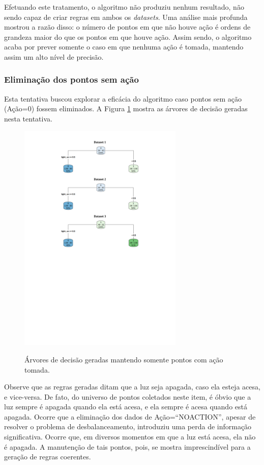 Efetuando este tratamento, o algoritmo não produziu nenhum resultado, não sendo capaz de criar regras em ambos os \textit{datasets}. Uma análise mais profunda mostrou a razão disso: o número de pontos em que não houve ação é ordens de grandeza maior do que os pontos em que houve ação. Assim sendo, o algoritmo acaba por prever somente o caso em que nenhuma ação é tomada, mantendo assim um alto nível de precisão. 

\subsubsection{Eliminação dos pontos sem ação} \label{subsubsec:elim_pts_sem_acao}
Esta tentativa buscou explorar a eficácia do algoritmo caso pontos sem ação (Ação=0) fossem eliminados. A Figura \ref{fig:teste_3} mostra as árvores de decisão geradas nesta tentativa.

\begin{figure}[hp]
	\centering
	\caption{Árvores de decisão geradas mantendo somente pontos com ação tomada.}
  \includegraphics[width=0.7\textwidth]{imagens/teste_learning/3.pdf}
  \label{fig:teste_3}  
\end{figure}

Observe que as regras geradas ditam que a luz seja apagada, caso ela esteja acesa, e vice-versa. De fato, do universo de pontos coletados neste item, é óbvio que a luz sempre é apagada quando ela está acesa, e ela sempre é acesa quando está apagada. Ocorre que a eliminação dos dados de Ação=``NO\underline{\space}ACTION'', apesar de resolver o problema de desbalanceamento, introduziu uma perda de informação significativa. Ocorre que, em diversos momentos em que a luz está acesa, ela não é apagada. A manutenção de tais pontos, pois, se mostra imprescindível para a geração de regras coerentes.

